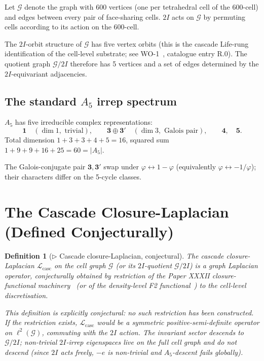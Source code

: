 \documentclass[12pt]{article}
\newtheorem{definition}[theorem]{Definition}
\newcommand{\phig}{\varphi}
\newcommand{\Lcasc}{\mathcal{L}_{\mathrm{casc}}}
\begin{document}
Let $\mathcal{G}$ denote the graph with $600$ vertices (one per
tetrahedral cell of the 600-cell) and edges between every pair of
face-sharing cells. $2I$ acts on $\mathcal{G}$ by permuting cells
according to its action on the 600-cell.

The $2I$-orbit structure of $\mathcal{G}$ has five vertex orbits
(this is the cascade Life-rung identification of the cell-level
substrate; see WO-1~\cite{SmartCapsid}, catalogue entry R.0).
The quotient graph $\mathcal{G}/2I$ therefore has 5 vertices and
a set of edges determined by the $2I$-equivariant adjacencies.

\subsection{The standard $A_5$ irrep spectrum}

$A_5$ has five irreducible complex representations:
\[
\mathbf{1} \quad (\dim 1, \text{ trivial}), \qquad
\mathbf{3} \oplus \mathbf{3}' \quad (\dim 3, \text{ Galois pair}), \qquad
\mathbf{4}, \quad \mathbf{5}.
\]
Total dimension $1 + 3 + 3 + 4 + 5 = 16$, squared sum
$1 + 9 + 9 + 16 + 25 = 60 = |A_5|$.

The Galois-conjugate pair $\mathbf{3}, \mathbf{3}'$ swap under
$\phig \leftrightarrow 1 - \phig$ (equivalently
$\phig \leftrightarrow -1/\phig$); their characters differ on the
5-cycle classes.

\section{The Cascade Closure-Laplacian (Defined Conjecturally)}\label{sec:laplacian}

\begin{definition}[$\triangleright$ Cascade closure-Laplacian, conjectural]\label{def:D2}
The \emph{cascade closure-Laplacian} $\Lcasc$ on the cell graph
$\mathcal{G}$ (or its $2I$-quotient $\mathcal{G}/2I$) is a
graph Laplacian operator, conjecturally obtained by restriction
of the Paper XXXII closure-functional
machinery~\cite[\S 4]{SmartXXXII} (or of the density-level F2
functional~\cite[\S F2]{CascadeFoundations}) to the cell-level
discretisation.

This definition is explicitly \emph{conjectural}: no such
restriction has been constructed. If the restriction exists,
$\Lcasc$ would be a symmetric positive-semi-definite operator on
$\ell^2(\mathcal{G})$, commuting with the $2I$ action. The
invariant sector descends to $\mathcal{G}/2I$; non-trivial
$2I$-irrep eigenspaces live on the full cell graph and do not
descend (since $2I$ acts freely, $-e$ is non-trivial and
$A_5$-descent fails globally).
\end{definition}
\end{document}

